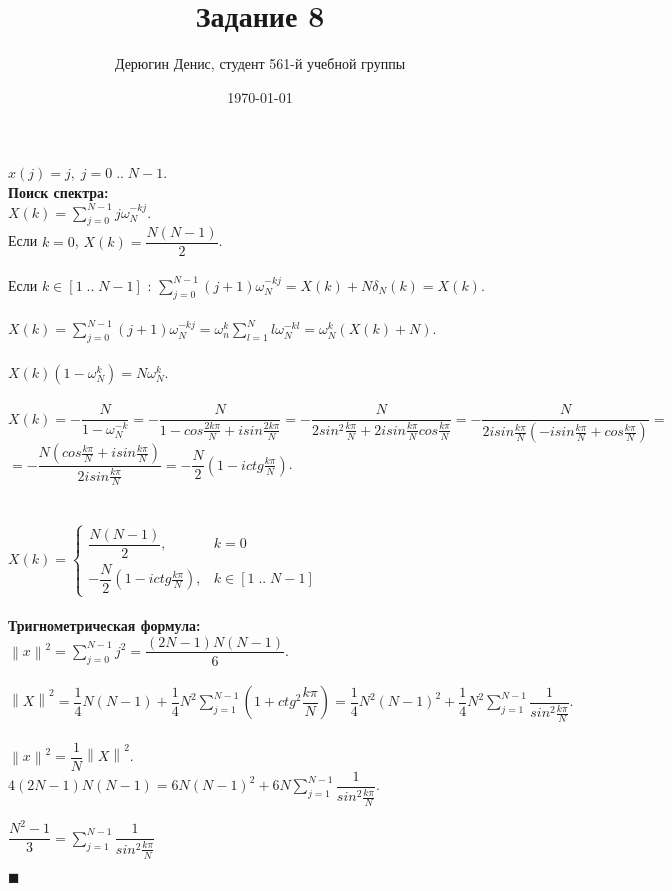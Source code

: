 \documentclass{article}
\title{Задание 8}
\author{
	Дерюгин Денис, студент 561-й учебной группы
}
\date{\today}
\newcommand\proofend{\begin{flushright}$\blacksquare$\end{flushright}}
\begin{document}
\maketitle
\large{
	$x(j) = j, \;j = 0\;..\;N-1$.\\
	\textbf{Поиск спектра:}\\

	$X(k) = \sum\limits_{j = 0}^{N - 1} j \omega_N^{-kj}$.\\
	Если $k = 0$, $X(k) = \dfrac{N(N-1)}{2}$.\\ \\

	Если $k \in [1\;..\;N-1]$ : $\sum\limits_{j = 0}^{N - 1} (j + 1) \omega_N^{-kj} = X(k) + N\delta_N(k) = X(k)$.\\ \\
	$X(k) = \sum\limits_{j = 0}^{N - 1} (j + 1) \omega_N^{-kj} = \omega_n^k\sum\limits_{l = 1}^N l\omega_N^{-kl} = \omega_N^k(X(k) + N)$.\\ \\
	$X(k) (1 - \omega_N^k) = N \omega_N^k$. \\ \\
	$X(k) = -\dfrac{N}{1 - \omega_N^{-k}} = -\dfrac{N}{1 - cos\frac{2k\pi}{N} + i sin\frac{2k\pi}{N}} = -\dfrac{N}{2sin^2\frac{k\pi}{N} + 2isin\frac{k\pi}{N}cos\frac{k\pi}{N}} = -\dfrac{N}{2isin\frac{k\pi}{N}(-isin\frac{k\pi}{N} + cos\frac{k\pi}{N})} = $\\
	$ = -\dfrac{N(cos\frac{k\pi}{N} + isin\frac{k\pi}{N})}{2isin\frac{k\pi}{N}} = -\dfrac{N}{2}(1 - ictg\frac{k\pi}{N})$. \\ \\ \\


	$X(k) = \left\{\begin{matrix}
		\dfrac{N(N - 1)}{2}, & k = 0 \\
		-\dfrac{N}{2}(1 - ictg\frac{k\pi}{N}), & k \in [1\;..\;N-1]
	\end{matrix}\right.$ \\ \\


	\textbf{Тригнометрическая формула:}\\

	$\left \| x \right \|^2 = \sum\limits_{j = 0}^{N - 1} j^2 = \dfrac{(2N - 1)N(N - 1)}{6}$.\\ \\

	$\left \| X \right \|^2 = \dfrac{1}{4}N(N-1) + \dfrac{1}{4}N^2\sum\limits_{j = 1}^{N - 1}(1 + ctg^2\dfrac{k\pi}{N}) = \dfrac{1}{4}N^2(N-1)^2 + \dfrac{1}{4}N^2\sum\limits_{j = 1}^{N - 1}\dfrac{1}{sin^2\frac{k\pi}{N}}.$ \\ \\

	$\left \| x \right \|^2 = \dfrac{1}{N}\left \| X \right \|^2 $. \\

	$4(2N - 1)N(N - 1) = 6N(N - 1)^2 + 6N\sum\limits_{j = 1}^{N - 1}\dfrac{1}{sin^2\frac{k\pi}{N}}$.

	$\dfrac{N^2 - 1}{3} = \sum\limits_{j = 1}^{N - 1}\dfrac{1}{sin^2\frac{k\pi}{N}}$


	\proofend


}
\end{document}
